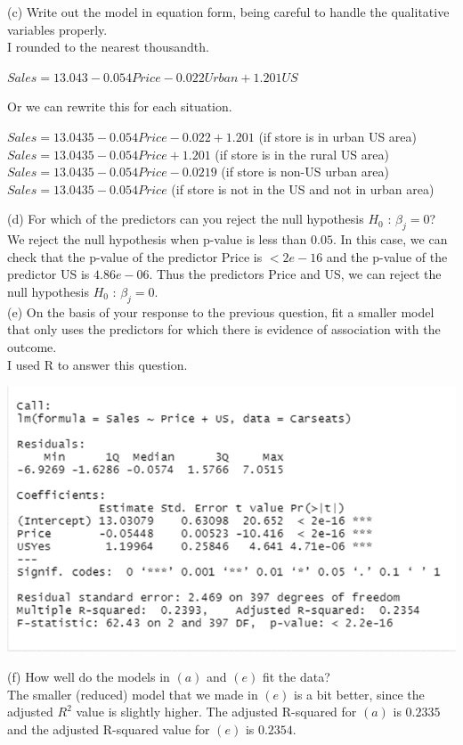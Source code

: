 \documentclass{article}
\begin{document}
\linebreak (c) Write out the model in equation form, being careful to handle the qualitative variables properly. \\
\indent I rounded to the nearest thousandth.
\begin{center}
    $Sales = 13.043 - 0.054Price - 0.022Urban + 1.201US$ %
\end{center}
\indent \indent Or we can rewrite this for each situation.
\begin{center}
    $Sales = 13.0435 − 0.054Price − 0.022 + 1.201$ (if store is in urban US area) \\ 
    $Sales = 13.0435 − 0.054Price + 1.201$ (if store is in the rural US area) \\
    $Sales = 13.0435 − 0.054Price − 0.0219$ (if store is non-US urban area) \\
    $Sales = 13.0435 − 0.054Price$ (if store is not in the US and not in urban area)
\end{center}
(d) For which of the predictors can you reject the null hypothesis $H_0$ : $\beta_j = 0$? \\
\indent \indent We reject the null hypothesis when p-value is less than $0.05$. In this case, we can check that the p-value of the predictor Price is $< 2e-16$ and the p-value of the predictor US is $4.86e-06$. Thus the predictors Price and US, we can reject the null hypothesis $H_0$ : $\beta_j = 0$. \\
\linebreak (e) On the basis of your response to the previous question, fit a smaller model that only uses the predictors for which there is evidence of association with the outcome. \\
\indent I used R to answer this question.
\begin{center}
\includegraphics[scale = 0.46]{4.10.e.png} \\
\end{center}
(f) How well do the models in $(a)$ and $(e)$ fit the data? \\
\indent The smaller (reduced) model that we made in $(e)$ is a bit better, since the adjusted $R^2$ value is slightly higher. The adjusted R-squared for $(a)$ is $0.2335$ and the adjusted R-squared value for $(e)$ is $0.2354$.
\end{document}
